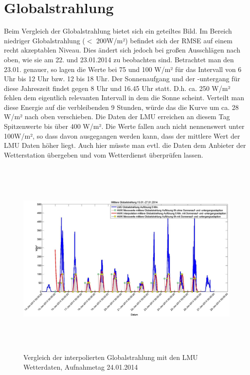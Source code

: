 \section{Globalstrahlung}
Beim Vergleich der Globalstrahlung bietet sich ein geteiltes Bild. Im Bereich niedriger Globalstrahlung ($<$ 200W/m²) befindet sich der RMSE auf einem recht akzeptablen Niveau. Dies ändert sich jedoch bei großen Ausschlägen nach oben, wie sie am 22. und 23.01.2014 zu beobachten sind. Betrachtet man den 23.01. genauer, so lagen die Werte bei 75 und 100 W/m² für das Intervall von 6 Uhr bis 12 Uhr bzw. 12 bis 18 Uhr. Der Sonnenaufgang und der -untergang für diese Jahreszeit findet gegen 8 Uhr und 16.45 Uhr statt. D.h. ca. 250 W/m² fehlen dem eigentlich relevanten Intervall in dem die Sonne scheint. Verteilt man diese Energie auf die verbleibenden 9 Stunden, würde das die Kurve um ca. 28 W/m² nach oben verschieben. Die Daten der LMU erreichen an diesem Tag Spitzenwerte bis über 400 W/m². Die Werte fallen auch nicht nennenswert unter 100W/m², so dass davon ausgegangen werden kann, dass der mittlere Wert der LMU Daten höher liegt. Auch hier müsste man evtl. die Daten dem Anbieter der Wetterstation übergeben und vom Wetterdienst überprüfen lassen.   
\begin{figure}[htbp]
\centering
\includegraphics[width=16cm,height=10cm]{analyse/globalstr2}
\caption{Vergleich der interpolierten Globalstrahlung mit den LMU Wetterdaten, Aufnahmetag 24.01.2014}
\label{fig:globalstr}
\end{figure}
